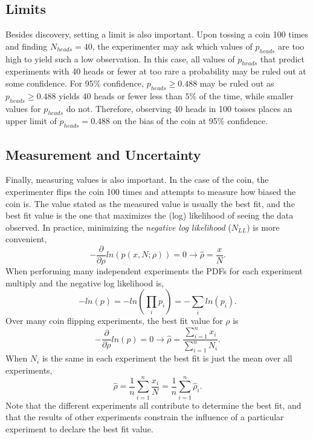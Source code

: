 \documentclass[12pt]{article}
\begin{document}
\subsection{Limits}

Besides discovery, setting a limit is also important. Upon tossing a coin 100 times and finding $N_{heads}=40$, the experimenter may ask which values of $p_{heads}$ are too high to yield such a low observation. In this case, all values of $p_{heads}$ that predict experiments with 40 heads or fewer at too rare a probability may be ruled out at some confidence. For 95\% confidence, $p_{heads} \geq 0.488$ may be ruled out as $p_{heads} \geq 0.488$ yields 40 heads or fewer less than $5\%$ of the time, while smaller values for $p_{heads}$ do not. Therefore, observing 40 heads in 100 tosses places an upper limit of $p_{heads}=0.488$ on the bias of the coin at 95\% confidence. 

\subsection{Measurement and Uncertainty}
\label{meas}
 
Finally, measuring values is also important. In the case of the coin, the experimenter flips the coin 100 times and attempts to measure how biased the coin is. The value stated as the measured value is usually the best fit, and the best fit value is the one that maximizes the (log) likelihood of seeing the data observed. In practice, minimizing the \textit{negative log likelihood} ($N_{LL}$) is more convenient, 
\begin{equation}
-\frac{\partial}{\partial \rho}ln\left(p(x,N;\rho)\right) = 0 \rightarrow \hat{\rho} = \frac{x}{N}.
\end{equation}   
When performing many independent experiments the PDFs for each experiment multiply and the negative log likelihood is,
\begin{equation}
-ln(p) = -ln\left(\prod_i p_i\right) = -\sum_i ln\left(p_i\right).
\end{equation}
Over many coin flipping experiments, the best fit value for $\rho$ is
\begin{equation}
-\frac{\partial}{\partial \rho}ln(p) = 0 \rightarrow \hat{\rho} = \frac{\sum_{i=1}^{n} x_i}{\sum_{i=1}^{n} N_i}.
\end{equation}
When $N_i$ is the same in each experiment the best fit is just the mean over all experiments,
\begin{equation}
\hat{\rho} = \frac{1}{n} \sum_{i=1}^{n} \frac{x_i}{N} = \frac{1}{n} \sum_{i=1}^{n} \hat{\rho}_i.
\end{equation}
Note that the different experiments all contribute to determine the best fit, and that the results of other experiments constrain the influence of a particular experiment to declare the best fit value.  
\end{document}
